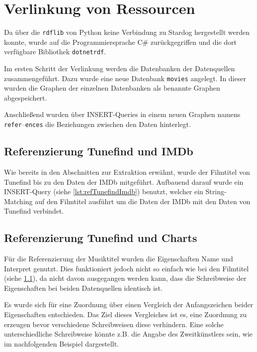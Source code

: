 \documentclass[parskip]{scrartcl}
\begin{document}
\section{Verlinkung von Ressourcen}

Da über die \texttt{rdflib} von Python keine Verbindung zu Stardog hergestellt werden konnte, wurde auf die Programmiersprache C\# zurückgegriffen und die dort verfügbare Bibliothek \texttt{dotnetrdf}.

Im ersten Schritt der Verlinkung werden die Datenbanken der Datenquellen zusammengeführt. Dazu wurde eine neue Datenbank \texttt{movies} angelegt. In dieser wurden die Graphen der einzelnen Datenbanken als benannte Graphen abgespeichert.

Anschließend wurden über INSERT-Queries in einem neuen Graphen namens \texttt{refer}--\texttt{ences} die Beziehungen zwischen den Daten hinterlegt.

\subsection{Referenzierung Tunefind und IMDb}
\label{subsec:refTunefindImdb}

Wie bereits in den Abschnitten zur Extraktion erwähnt, wurde der Filmtitel von Tunefind bis zu den Daten der IMDb mitgeführt. Aufbauend darauf wurde ein INSERT-Query (siehe \autoref{lst:refTunefindImdb}) benutzt, welcher ein String-Matching auf den Filmtitel ausführt um die Daten der IMDb mit den Daten von Tunefind verbindet. 



\subsection{Referenzierung Tunefind und Charts}

Für die Referenzierung der Musiktitel wurden die Eigenschaften Name und Interpret genutzt. Dies funktioniert jedoch nicht so einfach wie bei den Filmtitel (siehe \ref{subsec:refTunefindImdb}), da nicht davon ausgegangen werden kann, dass die Schreibweise der Eigenschaften bei beiden Datenquellen identisch ist.

Es wurde sich für eine Zuordnung über einen Vergleich der Anfangszeichen beider Eigenschaften entschieden. Das Ziel dieses Vergleiches ist es, eine Zuordnung zu erzeugen bevor verschiedene Schreibweisen diese verhindern. Eine solche unterschiedliche Schreibweise könnte z.B. die Angabe des Zweitkünstlers sein, wie im nachfolgenden Beispiel dargestellt.
\end{document}
